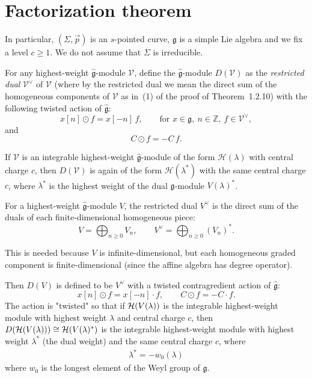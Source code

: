 \documentclass[12pt]{article}
\begin{document}
\section{Factorization theorem}
In particular, $(\Sigma,\vec{p})$ is an $s$-pointed curve, $\mathfrak g$ is a simple Lie algebra and we fix a level $c\ge1$. We do not assume that $\Sigma$ is irreducible.

\begin{definition}\label{def:restricted-dual}
For any highest-weight $\widehat{\mathfrak g}$-module $\mathcal V$, define the $\widehat{\mathfrak g}$-module $D(\mathcal V)$ as the \emph{restricted dual} $\mathcal V^\vee$ of $\mathcal V$ (where by the restricted dual we mean the direct sum of the homogeneous components of $\mathcal V$ as in~(1) of the proof of Theorem~1.2.10) with the following twisted action of $\widehat{\mathfrak g}$:
\[
  x[n] \odot f = x[-n]\,f, \qquad \text{for } x\in\mathfrak g,~n\in\mathbb Z,~f\in\mathcal V^\vee,
\]
and
\[
  C \odot f = -C\,f.
\]
\end{definition}

If $\mathcal V$ is an integrable highest-weight $\widehat{\mathfrak g}$-module of the form $\mathcal H(\lambda)$ with central charge $c$, then $D(\mathcal V)$ is again of the form $\mathcal H(\lambda^*)$ with the same central charge $c$, where $\lambda^*$ is the highest weight of the dual $\mathfrak g$-module $V(\lambda)^*$.

\begin{remark}
     For a highest-weight $\widehat{\mathfrak g}$-module $V$, the restricted dual $V^\vee$ is the direct sum of the duals of each finite-dimensional homogeneous piece:
    \[
    V = \bigoplus_{n\geq 0} V_n,\qquad V^\vee = \bigoplus_{n\geq 0} (V_n)^*.
    \]

    This is needed because $V$ is infinite-dimensional, but each homogeneous graded component is finite-dimensional (since the affine algebra has degree operator).

    Then $D(V)$ is defined to be $V^\vee$ with a twisted contragredient action of $\widehat{\mathfrak g}$:
    \[
    x[n] \odot f = x[-n]\cdot f,\qquad C \odot f = -C\cdot f.
    \]
    The action is "twisted" so that if ${\mathcal{H}}(V(\lambda))$ is the integrable highest-weight module with highest weight $\lambda$ and central charge $c$, then $D({\mathcal{H}}(V(\lambda))) \cong {\mathcal{H}}(V(\lambda)^*)$ is the integrable highest-weight module with highest weight $\lambda^*$ (the dual weight) and the same central charge $c$, where \begin{align*}
        \lambda^* = - w_0(\lambda)
    \end{align*} where $w_0$ is the longest element of the Weyl group of $\mathfrak g$.

\end{remark}
\end{document}
